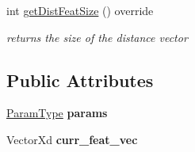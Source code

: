 \begin{DoxyCompactItemize}
\item 
\hypertarget{classSSIM_a47aaa357ebbfe4ddc61cf0cc555b4c8b}{int \hyperlink{classSSIM_a47aaa357ebbfe4ddc61cf0cc555b4c8b}{get\-Dist\-Feat\-Size} () override}\label{classSSIM_a47aaa357ebbfe4ddc61cf0cc555b4c8b}

\begin{DoxyCompactList}\small\item\em returns the size of the distance vector \end{DoxyCompactList}\end{DoxyCompactItemize}
\subsection*{Public Attributes}
\begin{DoxyCompactItemize}
\item 
\hypertarget{classSSIM_a9f57d6b5ec753fdf910fac608ba33b21}{\hyperlink{structSSIMParams}{Param\-Type} {\bfseries params}}\label{classSSIM_a9f57d6b5ec753fdf910fac608ba33b21}

\item 
\hypertarget{classSSIM_ac62c5773fca246d691e3bf6463a64fe8}{Vector\-Xd {\bfseries curr\-\_\-feat\-\_\-vec}}\label{classSSIM_ac62c5773fca246d691e3bf6463a64fe8}

\end{DoxyCompactItemize}
